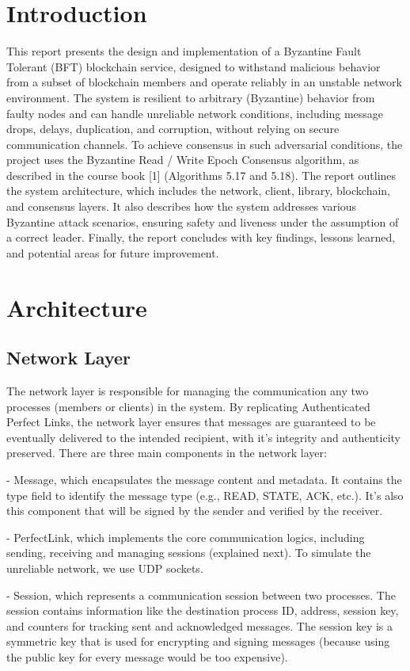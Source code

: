 \documentclass[runningheads]{llncs}
\begin{document}
\section{Introduction}
This report presents the design and implementation of a Byzantine Fault Tolerant
(BFT) blockchain service, designed to withstand malicious behavior from a subset
of blockchain members and operate reliably in an unstable network environment.
The system is resilient to arbitrary (Byzantine) behavior from faulty nodes and
can handle unreliable network conditions, including message drops, delays,
duplication, and corruption, without relying on secure communication channels.
To achieve consensus in such adversarial conditions, the project uses the
Byzantine Read / Write Epoch Consensus algorithm, as described in the course
book [1] (Algorithms 5.17 and 5.18). The report outlines the system
architecture, which includes the network, client, library, blockchain, and
consensus layers. It also describes how the system addresses various Byzantine
attack scenarios, ensuring safety and liveness under the assumption of a correct
leader. Finally, the report concludes with key findings, lessons learned, and
potential areas for future improvement.
%
\section{Architecture}
\subsection{Network Layer}
The network layer is responsible for managing the communication any two
processes (members or clients) in the system. By replicating Authenticated
Perfect Links, the network layer ensures that messages are guaranteed to be
eventually delivered to the intended recipient, with it's integrity and
authenticity preserved. There are three main components in the network layer: 

- Message, which encapsulates the message content and metadata. It contains the
type field to identify the message type (e.g., READ, STATE, ACK, etc.). It's
also this component that will be signed by the sender and verified by the
receiver. 

- PerfectLink, which implements the core communication logics, including
sending, receiving and managing sessions (explained next). To simulate the
unreliable network, we use UDP sockets. 

- Session, which represents a communication session between two processes. The
session contains information like the destination process ID, address, session
key, and counters for tracking sent and acknowledged messages. The session key
is a symmetric key that is used for encrypting and signing messages (because using the public key for
every message would be too expensive).
\end{document}
